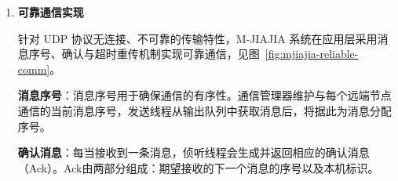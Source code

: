 {\begin{enumerate}[label=\arabic*.]
\begin{algorithm}[H]
\begin{algorithmic}[1]
                        \State
                        \State $ack \gets \{ msg.seqno+1, msg.topid \}$
                        \State initialize $ack\_addr \gets \{ ack\_port,hosts[msg.frompid].ip \}$
                        \State {}
    
                        \State
                            \State $rcv\_seq[to\_id]$++
                            \State {} 
                        \EndIf
                    \EndFor
                \EndWhile
                \State \textbf{return}
             \EndProcedure
        \end{algorithmic}
    \end{algorithm}

    \textbf{服务线程}：服务线程负责从输入队列中提取消息，并根据消息类型进行相应的服务。伪代码如算法~\ref{alg:server-thread} 所示。
    \begin{algorithm}[H]
        \caption{server thread algorithm}\label{alg:server-thread}
        \begin{algorithmic}[1] %
                \State {}
    
                \State $msg\_ptr \gets$ 
                \State {}
    
                \State {}
                \State \textbf{return}
             \EndProcedure
        \end{algorithmic}
    \end{algorithm}

    \item \textbf{可靠通信实现}
    
    针对 UDP 协议无连接、不可靠的传输特性，M-JIAJIA 系统在应用层采用消息序号、确认与超时重传机制实现可靠通信，见图~\ref{fig:mjiajia-reliable-comm}。
    
    \textbf{消息序号}：消息序号用于确保通信的有序性。通信管理器维护与每个远端节点通信的当前消息序号，发送线程从输出队列中获取消息后，将据此为消息分配序号。

    \textbf{确认消息}：每当接收到一条消息，侦听线程会生成并返回相应的确认消息（Ack）。Ack由两部分组成：期望接收的下一个消息的序号以及本机标识。


\end{enumerate}}
